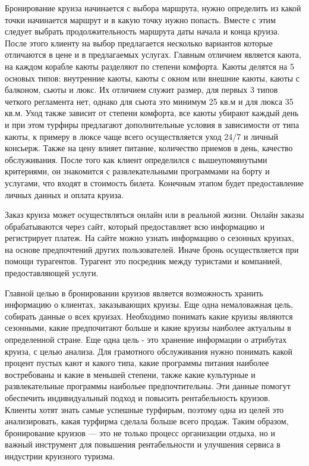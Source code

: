 \documentclass[11pt,a4paper,final]{article}
\begin{document}
{ Бронирование круиза начинается с выбора маршрута, нужно определить из какой точки начинается маршрут и в какую точку нужно попасть. Вместе с этим следует выбрать продолжительность маршрута даты начала и конца круиза. После этого клиенту на выбор предлагается несколько вариантов которые отличаются в цене и в предлагаемых услугах. Главным отличием является каюта, на каждом корабле каюты разделяют по степени комфорта. Каюты делятся на 5 основых типов: внутренние каюты, каюты с окном или внешние каюты, каюты с балконом, сьюты и люкс. Их отличием служит размер, для первых 3 типов четкого регламента нет, однако для сьюта это минимум 25 кв.м и для люкса 35 кв.м. Уход также зависит от степени комфорта, все каюты убирают каждый день и при этом турфиры предлагают дополнительные условия в зависимости от типа каюты, к примеру в люксе чаще всего осуществляется уход 24/7 и личный консьерж. Также на цену влияет питание, количество приемов в день, качество обслуживания. После того как клиент определился с вышеупомянутыми критериями, он знакомится с  развлекательными программами на  борту и услугами, что входят в стоимость билета. Конечным этапом будет предоставление личных данных и оплата круиза. 

 Заказ круиза может осуществляться онлайн или в реальной жизни. Онлайн заказы обрабатываются через сайт, который предоставляет всю информацию и регистрирует платеж. На сайте можно узнать информацию о сезонных круизах, на основе предпочтений других пользователей. Иначе бронь осуществляется при помощи турагентов. Турагент это посредник между туристами и компанией,  предоставляющей услуги. 
 
 Главной целью в бронировании круизов является возможность хранить информацию о клиентах, заказывающих круизы. Еще одна немаловажная цель, собирать данные о всех круизах. Необходимо понимать какие круизы являются сезонными, какие предпочитают больше и какие круизы наиболее актуальны в определенной стране. Еще одна цель - это хранение информации о атрибутах круиза, с целью анализа. Для грамотного обслуживания нужно понимать какой процент пустых кают и какого типа, какие программы питания наиболее востребованы и какие в меньшей степени, также какие культурные и развлекательные программы наибольее предпочтительны. Эти данные помогут обеспечить индивидуальный подход и повысить рентабельность круизов. Клиенты хотят знать самые успешные турфирым, поэтому одна из целей это анализировать, какая турфирма сделала больше всего продаж. Таким образом, бронирование круизов — это не только процесс организации отдыха, но и важный инструмент для повышения рентабельности и улучшения сервиса в индустрии круизного туризма.

 }
\end{document}
